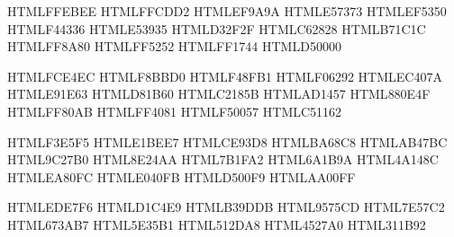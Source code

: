 
\definecolor{Red-50}          {HTML}{FFEBEE}
\definecolor{Red-100}         {HTML}{FFCDD2}
\definecolor{Red-200}         {HTML}{EF9A9A}
\definecolor{Red-300}         {HTML}{E57373}
\definecolor{Red-400}         {HTML}{EF5350}
\definecolor{Red-500}         {HTML}{F44336}
\definecolor{Red-600}         {HTML}{E53935}
\definecolor{Red-700}         {HTML}{D32F2F}
\definecolor{Red-800}         {HTML}{C62828}
\definecolor{Red-900}         {HTML}{B71C1C}
\definecolor{Red-A100}        {HTML}{FF8A80}
\definecolor{Red-A200}        {HTML}{FF5252}
\definecolor{Red-A400}        {HTML}{FF1744}
\definecolor{Red-A700}        {HTML}{D50000}

\definecolor{Pink-50}         {HTML}{FCE4EC}
\definecolor{Pink-100}        {HTML}{F8BBD0}
\definecolor{Pink-200}        {HTML}{F48FB1}
\definecolor{Pink-300}        {HTML}{F06292}
\definecolor{Pink-400}        {HTML}{EC407A}
\definecolor{Pink-500}        {HTML}{E91E63}
\definecolor{Pink-600}        {HTML}{D81B60}
\definecolor{Pink-700}        {HTML}{C2185B}
\definecolor{Pink-800}        {HTML}{AD1457}
\definecolor{Pink-900}        {HTML}{880E4F}
\definecolor{Pink-A100}       {HTML}{FF80AB}
\definecolor{Pink-A200}       {HTML}{FF4081}
\definecolor{Pink-A400}       {HTML}{F50057}
\definecolor{Pink-A700}       {HTML}{C51162}

\definecolor{Purple-50}       {HTML}{F3E5F5}
\definecolor{Purple-100}      {HTML}{E1BEE7}
\definecolor{Purple-200}      {HTML}{CE93D8}
\definecolor{Purple-300}      {HTML}{BA68C8}
\definecolor{Purple-400}      {HTML}{AB47BC}
\definecolor{Purple-500}      {HTML}{9C27B0}
\definecolor{Purple-600}      {HTML}{8E24AA}
\definecolor{Purple-700}      {HTML}{7B1FA2}
\definecolor{Purple-800}      {HTML}{6A1B9A}
\definecolor{Purple-900}      {HTML}{4A148C}
\definecolor{Purple-A100}     {HTML}{EA80FC}
\definecolor{Purple-A200}     {HTML}{E040FB}
\definecolor{Purple-A400}     {HTML}{D500F9}
\definecolor{Purple-A700}     {HTML}{AA00FF}

\definecolor{Deep-Purple-50}  {HTML}{EDE7F6}
\definecolor{Deap-Purple-100} {HTML}{D1C4E9}
\definecolor{Deap-Purple-200} {HTML}{B39DDB}
\definecolor{Deap-Purple-300} {HTML}{9575CD}
\definecolor{Deap-Purple-400} {HTML}{7E57C2}
\definecolor{Deap-Purple-500} {HTML}{673AB7}
\definecolor{Deap-Purple-600} {HTML}{5E35B1}
\definecolor{Deap-Purple-700} {HTML}{512DA8}
\definecolor{Deap-Purple-800} {HTML}{4527A0}
\definecolor{Deap-Purple-900} {HTML}{311B92}

